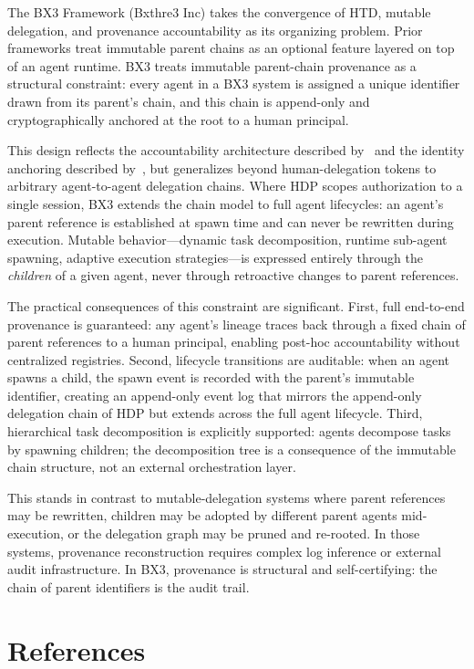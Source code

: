 The BX3 Framework (Bxthre3 Inc) takes the convergence of HTD, mutable delegation, and provenance accountability as its organizing problem. Prior frameworks treat immutable parent chains as an optional feature layered on top of an agent runtime. BX3 treats immutable parent-chain provenance as a structural constraint: every agent in a BX3 system is assigned a unique identifier drawn from its parent's chain, and this chain is append-only and cryptographically anchored at the root to a human principal.

This design reflects the accountability architecture described by~\cite{draft-hdp2026} and the identity anchoring described by~\cite{draft-beyer-agent-identity}, but generalizes beyond human-delegation tokens to arbitrary agent-to-agent delegation chains. Where HDP scopes authorization to a single session, BX3 extends the chain model to full agent lifecycles: an agent's parent reference is established at spawn time and can never be rewritten during execution. Mutable behavior---dynamic task decomposition, runtime sub-agent spawning, adaptive execution strategies---is expressed entirely through the \emph{children} of a given agent, never through retroactive changes to parent references.

The practical consequences of this constraint are significant. First, full end-to-end provenance is guaranteed: any agent's lineage traces back through a fixed chain of parent references to a human principal, enabling post-hoc accountability without centralized registries. Second, lifecycle transitions are auditable: when an agent spawns a child, the spawn event is recorded with the parent's immutable identifier, creating an append-only event log that mirrors the append-only delegation chain of HDP but extends across the full agent lifecycle. Third, hierarchical task decomposition is explicitly supported: agents decompose tasks by spawning children; the decomposition tree is a consequence of the immutable chain structure, not an external orchestration layer.

This stands in contrast to mutable-delegation systems where parent references may be rewritten, children may be adopted by different parent agents mid-execution, or the delegation graph may be pruned and re-rooted. In those systems, provenance reconstruction requires complex log inference or external audit infrastructure. In BX3, provenance is structural and self-certifying: the chain of parent identifiers is the audit trail.

\section*{References}



